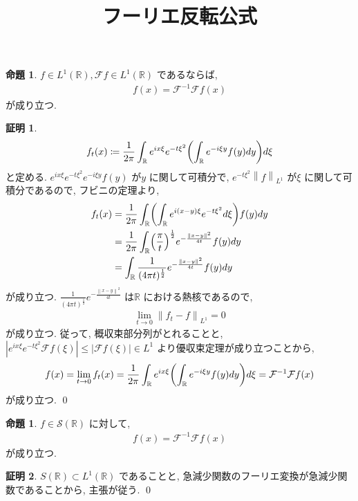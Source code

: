 \documentclass[10pt, fleqn, label-section=none]{bxjsarticle}
\title{フーリエ反転公式}
\date{}
\author{}
\theoremstyle{definition}
\newtheorem{prop}[dfn]{命題}
\newtheorem*{pf*}{証明}
\newcommand{\paren}[1]{\mleft( #1\mright )}
\newcommand{\abs}[1]{\left|#1\right|}
\newcommand{\norm}[1]{\left\|#1\right\|}
\renewcommand{\;}{\, ; \,}
\begin{document}
\maketitle

\section{}

\begin{prop}$f \in L^1(\mathbb R), \mathcal F f \in L^1(\mathbb R)$ であるならば, 
\begin{align*} f(x) = \mathcal F^{-1} \mathcal F f(x)  \end{align*}
が成り立つ. 
\end{prop}
\begin{pf*}

\begin{align*} f_t(x)              \coloneqq                  \frac{1}{2 \pi} \int_{\mathbb R} e^{ix \xi} e^{-t \xi ^2} \paren{\int_{\mathbb R} e^{- i \xi y} f(y) dy } d \xi                 \end{align*}
と定める. $e^{ix \xi} e^{-t \xi ^2} e^{- i \xi y} f(y)$ が$y$ に関して可積分で, $e^{- t \xi ^2} \norm{f}_{L^1}$ が$\xi$ に関して可積分であるので, フビニの定理より, 
\begin{align*} f_t (x) &=     \frac{1}{2 \pi} \int_{\mathbb R} \paren{ \int_{\mathbb R} e^{i(x - y) \xi} e^{-t \xi ^2}  d\xi }   f(y)                   dy \\&= \frac{1}{2 \pi} \int_{\mathbb R} \paren{\frac{ \pi }{t}}^{\frac{1}{2}} e^{- \frac{\norm{x - y} ^2 }{4t}}  f(y)      dy     \\& =    \int_{\mathbb R} \frac{1}{(4 \pi t)^{\frac{1}{2}}} e^{- \frac{\norm{x - y} ^2 }{4t}}  f(y)      dy      \end{align*}
が成り立つ. $\frac{1}{(4 \pi t)^{\frac{1}{2}}} e^{- \frac{\norm{x - y} ^2 }{4t}} $ は$\mathbb R$ における熱核であるので, 
\begin{align*} \lim_{t \rightarrow 0} \norm{f_t - f}_{L^1} = 0 \end{align*} 
が成り立つ. 従って, 概収束部分列がとれることと, $\abs{e^{ix\xi}e^{-t\xi^2} \mathcal F f (\xi)} \leq \abs{\mathcal F f(\xi)}  \in L^1$ より優収束定理が成り立つことから, 
\begin{align*} f(x) = \lim_{t \rightarrow 0} f_t (x) =  \frac{1}{2 \pi} \int_{\mathbb R} e^{ix \xi} \paren{\int_{\mathbb R} e^{- i \xi y} f(y) dy } d \xi   = \mathcal F^{-1} \mathcal F f (x) \end{align*}
が成り立つ. 
\qed
\end{pf*}



\begin{prop}$f \in \mathcal S (\mathbb R)$ に対して, 
\begin{align*} f(x) = \mathcal F^{-1} \mathcal F f(x) \end{align*}
が成り立つ. 
\end{prop}
\begin{pf*}
$ S (\mathbb R) \subset L^1 (\mathbb R)$ であることと, 急減少関数のフーリエ変換が急減少関数であることから, 主張が従う. 
\qed
\end{pf*}
\end{document}
